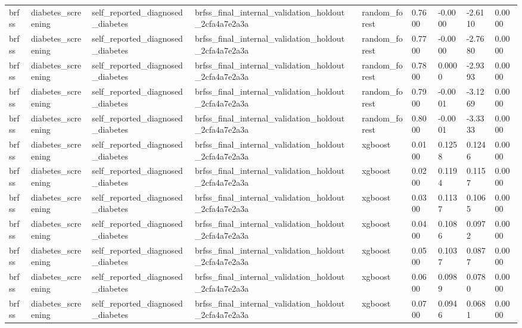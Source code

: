 \begin{tabular}{llllllllll}
brfss & diabetes\_screening & self\_reported\_diagnosed\_diabetes & brfss\_final\_internal\_validation\_holdout\_2cfa4a7e2a3a &  & random\_forest & 0.7600 & -0.0000 & -2.6110 & 0.0000 \\
brfss & diabetes\_screening & self\_reported\_diagnosed\_diabetes & brfss\_final\_internal\_validation\_holdout\_2cfa4a7e2a3a &  & random\_forest & 0.7700 & -0.0000 & -2.7680 & 0.0000 \\
brfss & diabetes\_screening & self\_reported\_diagnosed\_diabetes & brfss\_final\_internal\_validation\_holdout\_2cfa4a7e2a3a &  & random\_forest & 0.7800 & 0.0000 & -2.9393 & 0.0000 \\
brfss & diabetes\_screening & self\_reported\_diagnosed\_diabetes & brfss\_final\_internal\_validation\_holdout\_2cfa4a7e2a3a &  & random\_forest & 0.7900 & -0.0001 & -3.1269 & 0.0000 \\
brfss & diabetes\_screening & self\_reported\_diagnosed\_diabetes & brfss\_final\_internal\_validation\_holdout\_2cfa4a7e2a3a &  & random\_forest & 0.8000 & -0.0001 & -3.3333 & 0.0000 \\
brfss & diabetes\_screening & self\_reported\_diagnosed\_diabetes & brfss\_final\_internal\_validation\_holdout\_2cfa4a7e2a3a &  & xgboost & 0.0100 & 0.1258 & 0.1246 & 0.0000 \\
brfss & diabetes\_screening & self\_reported\_diagnosed\_diabetes & brfss\_final\_internal\_validation\_holdout\_2cfa4a7e2a3a &  & xgboost & 0.0200 & 0.1194 & 0.1157 & 0.0000 \\
brfss & diabetes\_screening & self\_reported\_diagnosed\_diabetes & brfss\_final\_internal\_validation\_holdout\_2cfa4a7e2a3a &  & xgboost & 0.0300 & 0.1137 & 0.1065 & 0.0000 \\
brfss & diabetes\_screening & self\_reported\_diagnosed\_diabetes & brfss\_final\_internal\_validation\_holdout\_2cfa4a7e2a3a &  & xgboost & 0.0400 & 0.1086 & 0.0972 & 0.0000 \\
brfss & diabetes\_screening & self\_reported\_diagnosed\_diabetes & brfss\_final\_internal\_validation\_holdout\_2cfa4a7e2a3a &  & xgboost & 0.0500 & 0.1037 & 0.0877 & 0.0000 \\
brfss & diabetes\_screening & self\_reported\_diagnosed\_diabetes & brfss\_final\_internal\_validation\_holdout\_2cfa4a7e2a3a &  & xgboost & 0.0600 & 0.0989 & 0.0780 & 0.0000 \\
brfss & diabetes\_screening & self\_reported\_diagnosed\_diabetes & brfss\_final\_internal\_validation\_holdout\_2cfa4a7e2a3a &  & xgboost & 0.0700 & 0.0946 & 0.0681 & 0.0000 \\

\end{tabular}
